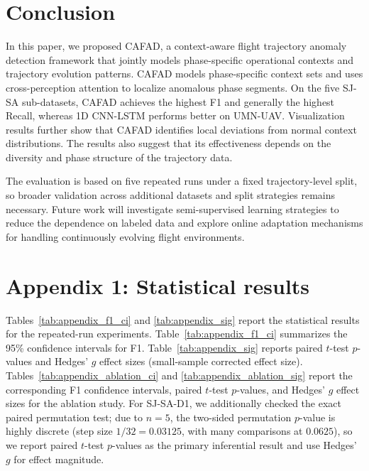 \documentclass[iicol,pdflatex,sn-basic,Numbered]{sn-jnl}%
\theoremstyle{thmstyleone}%
\theoremstyle{thmstyletwo}%
\theoremstyle{thmstylethree}%
\begin{document}
\section{Conclusion}\label{sec:conclusion}
In this paper, we proposed CAFAD, a context-aware flight trajectory anomaly detection framework that jointly models phase-specific operational contexts and trajectory evolution patterns. 
CAFAD models phase-specific context sets and uses cross-perception attention to localize anomalous phase segments.
On the five SJ-SA sub-datasets, CAFAD achieves the highest F1 and generally the highest Recall, whereas 1D CNN-LSTM performs better on UMN-UAV.
Visualization results further show that CAFAD identifies local deviations from normal context distributions.
The results also suggest that its effectiveness depends on the diversity and phase structure of the trajectory data.

The evaluation is based on five repeated runs under a fixed trajectory-level split, so broader validation across additional datasets and split strategies remains necessary.
Future work will investigate semi-supervised learning strategies to reduce the dependence on labeled data and explore online adaptation mechanisms for handling continuously evolving flight environments.

\appendix
\section*{Appendix 1: Statistical results}
Tables~\ref{tab:appendix_f1_ci} and \ref{tab:appendix_sig} report the statistical results for the repeated-run experiments.
Table~\ref{tab:appendix_f1_ci} summarizes the 95\% confidence intervals for F1.
Table~\ref{tab:appendix_sig} reports paired $t$-test $p$-values and Hedges' $g$ effect sizes (small-sample corrected effect size).
Tables~\ref{tab:appendix_ablation_ci} and \ref{tab:appendix_ablation_sig} report the corresponding F1 confidence intervals, paired $t$-test $p$-values, and Hedges' $g$ effect sizes for the ablation study.
For SJ-SA-D1, we additionally checked the exact paired permutation test; due to $n=5$, the two-sided permutation $p$-value is highly discrete (step size $1/32=0.03125$, with many comparisons at $0.0625$), so we report paired $t$-test $p$-values as the primary inferential result and use Hedges' $g$ for effect magnitude.
\end{document}
